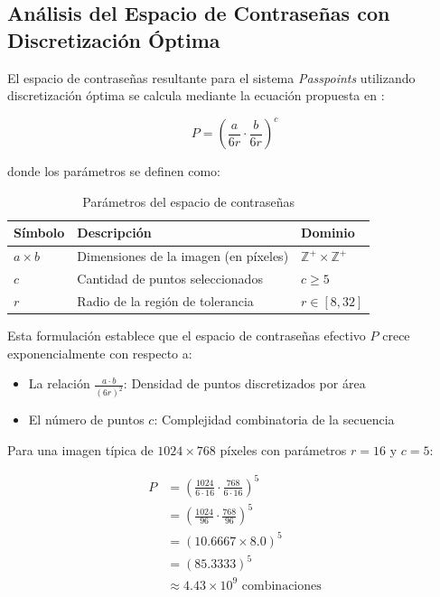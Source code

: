 \subsection{Análisis del Espacio de Contraseñas con Discretización Óptima}
\label{subsec:espacio-contrasenas}

El espacio de contraseñas resultante para el sistema \textit{Passpoints} utilizando discretización óptima se calcula mediante la ecuación propuesta en \cite{birget2006graphical}:

\begin{equation}
	P = \left( \frac{a}{6r} \cdot \frac{b}{6r} \right)^c
	\label{eq:espacio-contrasenas}
\end{equation}

donde los parámetros se definen como:

\begin{table}[ht]
	\centering
	\caption{Parámetros del espacio de contraseñas}
	\label{tab:parametros-espacio}
	\begin{tabularx}{0.9\textwidth}{lXl}
		\toprule
		\textbf{Símbolo} & \textbf{Descripción} & \textbf{Dominio} \\
		\midrule
		$a \times b$ & Dimensiones de la imagen (en píxeles) & $\mathbb{Z}^+ \times \mathbb{Z}^+$ \\
		$c$ & Cantidad de puntos seleccionados & $c \geq 5$ \\
		$r$ & Radio de la región de tolerancia & $r \in [8, 32]$ \\
		\bottomrule
	\end{tabularx}
\end{table}

\vspace{0.5cm}

Esta formulación establece que el espacio de contraseñas efectivo $P$ crece exponencialmente con respecto a:
\begin{itemize}
	\item La relación $\frac{a \cdot b}{(6r)^2}$: Densidad de puntos discretizados por área
	\item El número de puntos $c$: Complejidad combinatoria de la secuencia
\end{itemize}

Para una imagen típica de $1024 \times 768$ píxeles con parámetros $r = 16$ y $c = 5$:

\begin{align*}
	P &= \left( \frac{1024}{6 \cdot 16} \cdot \frac{768}{6 \cdot 16} \right)^5 \\
	&= \left( \frac{1024}{96} \cdot \frac{768}{96} \right)^5 \\
	&= (10.6667 \times 8.0)^5 \\
	&= (85.3333)^5 \\
	&\approx 4.43 \times 10^9 \text{ combinaciones}
\end{align*}

